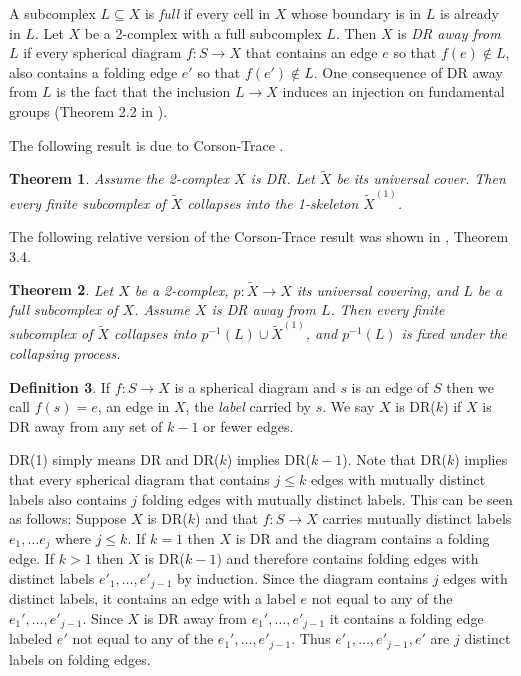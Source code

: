 \documentclass[12pt]{amsart}
\newtheorem{thm}{Theorem}[section]
\theoremstyle{definition}
\newtheorem{defn}[thm]{Definition}
\begin{document}
A subcomplex $L\subseteq X$ is {\em full} if every cell in $X$ whose boundary is in $L$ is already in $L$. Let $X$ be a 2-complex with a full subcomplex $L$. Then $X$ is {\em DR away from $L$} if every spherical diagram $f\colon S\to X$ that contains an edge $e$ so that $f(e)\not\in L$, also contains a folding edge $e'$ so that $f(e')\not\in L$. One consequence of DR away from $L$ is the fact that the inclusion $L\to X$ induces an injection on fundamental groups (Theorem 2.2 in \cite{HarRoseDDR}). 

The following result is due to Corson-Trace \cite{CorsonTrace}.

\begin{thm}\label{thm:CT} Assume the 2-complex $X$ is DR. Let $\tilde X$ be its universal cover. Then every finite subcomplex of $\tilde X$ collapses into the 1-skeleton $\tilde X^{(1)}$.
\end{thm}

The following relative version of the Corson-Trace result was shown in \cite{HarRoseDDR}, Theorem 3.4.

\begin{thm}\label{thm:relCT} Let $X$ be a 2-complex, $p\colon \tilde X\to X$ its universal covering, and $L$ be a full subcomplex of $X$. Assume $X$ is DR away from $L$. Then every finite subcomplex of $\tilde X$ collapses into $p^{-1}(L)\cup \tilde X^{(1)}$, and $p^{-1}(L)$ is fixed under the collapsing process.
\end{thm}


\begin{defn}
    If $f\colon S\to X$ is a spherical diagram and $s$ is an edge of $S$ then we call $f(s)=e$, an edge in $X$, the {\em label} carried by $s$. We say $X$ is DR($k$) if $X$ is DR away from any set of $k-1$ or fewer edges. 
\end{defn}

DR(1) simply means DR and DR($k$) implies DR($k-1$). Note that DR($k$) implies that every spherical diagram that contains $j\le k$ edges with mutually distinct labels also contains $j$ folding edges with mutually distinct labels. 
This can be seen as follows: Suppose $X$ is DR($k$) and that $f\colon S\to X$ carries mutually distinct labels $e_1,\ldots e_j$ where $j\le k$. If $k=1$ then $X$ is DR and the diagram contains a folding edge. If $k>1$ then $X$ is DR($k-1$) and therefore contains folding edges with distinct labels $e'_1,\ldots, e'_{j-1}$ by induction. Since the diagram contains $j$ edges with distinct labels, it contains an edge with a label $e$ not equal to any of the $e_1',\ldots, e'_{j-1}$. Since $X$ is DR away from $e_1',\ldots, e'_{j-1}$ it contains a folding edge labeled $e'$ not equal to any of the $e_1',\ldots, e'_{j-1}$. Thus $e'_1,\ldots, e'_{j-1}, e'$ are $j$ distinct labels on folding edges.
\end{document}

